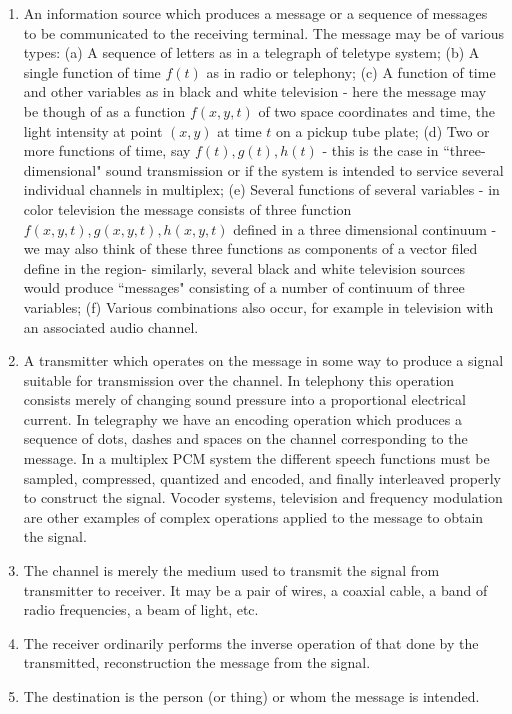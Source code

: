 \documentclass[12pt, oneside]{book}
\theoremstyle{definition}
\theoremstyle{definition}
\theoremstyle{remark}
\begin{document}
\begin{enumerate}
    \item An information source which produces a message or a sequence of messages to be communicated to the receiving terminal. The message may be of various types: (a) A sequence of letters as in a telegraph of teletype system; (b) A single function of time $f(t)$ as in radio or telephony; (c) A function of time and other variables as in black and white television - here the message may be though of as a function $f(x,y,t)$ of two space coordinates and time, the light intensity at point $(x,y)$ at time $t$ on a pickup tube plate; (d) Two or more functions of time, say $f(t),g(t),h(t)$ - this is the case in ``three-dimensional" sound transmission or if the system is intended to service several individual channels in multiplex; (e) Several functions of several variables - in color television the message consists of three function $f(x,y,t),g(x,y,t),h(x,y,t)$ defined in a three dimensional continuum - we may also think of these three functions as components of a vector filed define in the region- similarly, several black and white television sources would produce ``messages" consisting of a number of continuum of three variables; (f) Various combinations also occur, for example in television with an associated audio channel.
    \item A transmitter which operates on the message in some way to produce a signal suitable for transmission over the channel. In telephony this operation consists merely of changing sound pressure into a proportional electrical current. In telegraphy we have an encoding operation which produces a sequence of dots, dashes and spaces on the channel corresponding to the message. In a multiplex PCM system the different speech functions must be sampled, compressed, quantized and encoded, and finally interleaved properly to construct the signal. Vocoder systems, television and frequency modulation are other examples of complex operations applied to the message to obtain the signal.
    \item The channel is merely the medium used to transmit the signal from transmitter to receiver. It may be a pair of wires, a coaxial cable, a band of radio frequencies, a beam of light, etc.
    \item The receiver ordinarily performs the inverse operation of that done by the transmitted, reconstruction the message from the signal.
    \item The destination is the person (or thing) or whom the message is intended.
\end{enumerate}
\end{document}
